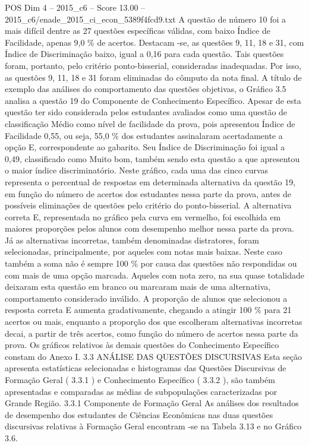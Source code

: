 \begin{textsample}{POS Dim 4 – 2015\_c6 – Score 13.00 – 2015\_c6/enade\_2015\_ci\_econ\_5389f4fcd9.txt}
A questão de número 10 foi a mais difícil dentre as 27 questões específicas válidas, com baixo Índice de Facilidade, apenas 9,0 \% de acertos.
Destacam -se, as questões 9, 11, 18 e 31, com Índice de Discriminação baixo, igual a 0,16 para cada questão.
Tais questões foram, portanto, pelo critério ponto-bisserial, consideradas inadequadas.
Por isso, as questões 9, 11, 18 e 31 foram eliminadas do cômputo da nota final.
A título de exemplo das análises do comportamento das questões objetivas, o Gráfico 3.5 analisa a questão 19 do Componente de Conhecimento Específico.
Apesar de esta questão ter sido considerada pelos estudantes avaliados como uma questão de classificação Médio como nível de facilidade da prova, pois apresentou Índice de Facilidade 0,55, ou seja, 55,0 \% dos estudantes assinalaram acertadamente a opção E, correspondente ao gabarito.
Seu Índice de Discriminação foi igual a 0,49, classificado como Muito bom, também sendo esta questão a que apresentou o maior índice discriminatório.
Neste gráfico, cada uma das cinco curvas representa o percentual de respostas em determinada alternativa da questão 19, em função do número de acertos dos estudantes nessa parte da prova, antes de possíveis eliminações de questões pelo critério do ponto-bisserial.
A alternativa correta E, representada no gráfico pela curva em vermelho, foi escolhida em maiores proporções pelos alunos com desempenho melhor nessa parte da prova.
Já as alternativas incorretas, também denominadas distratores, foram selecionadas, principalmente, por aqueles com notas mais baixas.
Neste caso também a soma não é sempre 100 \% por causa das questões não respondidas ou com mais de uma opção marcada.
Aqueles com nota zero, na sua quase totalidade deixaram esta questão em branco ou marcaram mais de uma alternativa, comportamento considerado inválido.
A proporção de alunos que selecionou a resposta correta E aumenta gradativamente, chegando a atingir 100 \% para 21 acertos ou mais, enquanto a proporção dos que escolheram alternativas incorretas decai, a partir de três acertos, como função do número de acertos nessa parte da prova.
Os gráficos relativos às demais questões do Conhecimento Específico constam do Anexo I. 3.3 ANÁLISE DAS QUESTÕES DISCURSIVAS Esta seção apresenta estatísticas selecionadas e histogramas das Questões Discursivas de Formação Geral ( 3.3.1 ) e Conhecimento Específico ( 3.3.2 ), são também apresentadas e comparadas as médias de subpopulações caracterizadas por Grande Região. 3.3.1 Componente de Formação Geral As análises dos resultados de desempenho dos estudantes de Ciências Econômicas nas duas questões discursivas relativas à Formação Geral encontram -se na Tabela 3.13 e no Gráfico 3.6.

\end{textsample}
